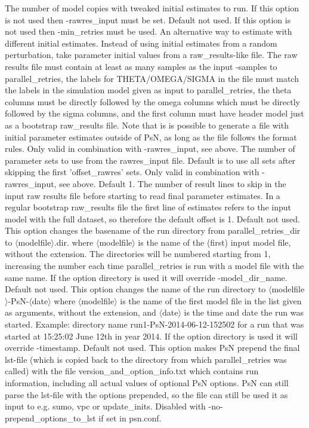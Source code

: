 \begin{optionlist}
The number of model copies with tweaked initial estimates to run. 
If this option is not used then -rawres\_input must be set.
\nextopt
{}
Default not used. If this option is not used then -min\_retries must be used.
An alternative way to estimate with different initial estimates. 
Instead of using initial estimates from a random perturbation, take parameter initial values from a raw\_results-like file.
The raw results file must contain at least as many samples as the input -samples to parallel\_retries, the labels for  THETA/OMEGA/SIGMA 
in the file must match the labels in the simulation model given as input to parallel\_retries, 
the theta columns must be directly followed by the omega columns which must be directly followed by the sigma columns, and the first column 
must have header model just as a bootstrap raw\_results file. Note that is is possible to generate a file with initial parameter estimates outside of PsN, 
as long as the file follows the format rules.
\nextopt
{}
Only valid in combination with -rawres\_input, see above. The number of
parameter sets to use from the rawres\_input file. 
Default is to use all sets after skipping the first 'offset\_rawres' sets.
\nextopt
{}
Only valid in combination with -rawres\_input, see above. Default 1.
The number of result lines to skip in the input raw results file before starting to read final parameter estimates. In a regular
bootstrap raw\_results file the first line of estimates refers to the input model with the full dataset, so therefore the default offset is 1.
\nextopt
{}
Default not used. This option changes the basename of the run directory from 
parallel\_retries\_dir to $\langle$modelfile$\rangle$.dir. where $\langle$modelfile$\rangle$ 
is the name of the (first) input model file, without the extension. 
The directories will be numbered starting from 1, increasing the number each time parallel\_retries 
is run with a model file with the 
same name. If the option directory is used it will override -model\_dir\_name.
\nextopt
{}
Default not used. This option changes the name of the run directory to $\langle$modelfile$\rangle$-PsN-$\langle$date$\rangle$
where $\langle$modelfile$\rangle$ is the name of the first model file in the list given as arguments, without the extension,
and $\langle$date$\rangle$ is the time and date the run was started. 
Example: directory name run1-PsN-2014-06-12-152502 for a run that was started at 15:25:02 June 12th in year 2014.
If the option directory is used it will override -timestamp.
\nextopt
{}
Default not used. This option makes PsN prepend the final lst-file (which is copied back to the directory from which parallel\_retries was called) with the file version\_and\_option\_info.txt which contains run information, including     all actual values of optional PsN options. PsN can still parse the lst-file with the options prepended, so the file can still be used it as input to e.g. sumo, vpc or update\_inits. Disabled with -no-prepend\_options\_to\_lst if set in psn.conf.
\nextopt
\end{optionlist}


